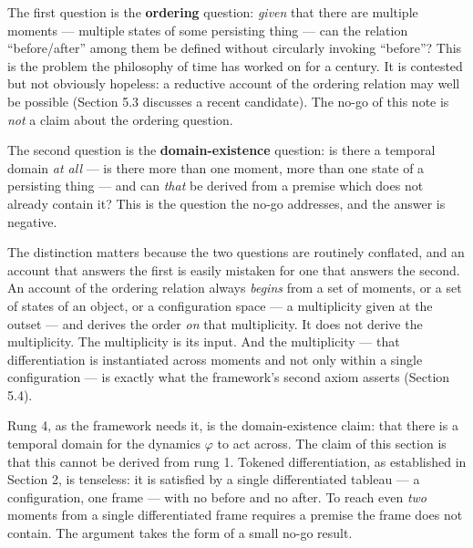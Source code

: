 \documentclass[
]{article}
\begin{document}
The first question is the \textbf{ordering} question: \emph{given} that
there are multiple moments --- multiple states of some persisting thing
--- can the relation ``before/after'' among them be defined without
circularly invoking ``before''? This is the problem the philosophy of
time has worked on for a century. It is contested but not obviously
hopeless: a reductive account of the ordering relation may well be
possible (Section 5.3 discusses a recent candidate). The no-go of this
note is \emph{not} a claim about the ordering question.

The second question is the \textbf{domain-existence} question: is there
a temporal domain \emph{at all} --- is there more than one moment, more
than one state of a persisting thing --- and can \emph{that} be derived
from a premise which does not already contain it? This is the question
the no-go addresses, and the answer is negative.

The distinction matters because the two questions are routinely
conflated, and an account that answers the first is easily mistaken for
one that answers the second. An account of the ordering relation always
\emph{begins} from a set of moments, or a set of states of an object, or
a configuration space --- a multiplicity given at the outset --- and
derives the order \emph{on} that multiplicity. It does not derive the
multiplicity. The multiplicity is its input. And the multiplicity ---
that differentiation is instantiated across moments and not only within
a single configuration --- is exactly what the framework's second axiom
asserts (Section 5.4).

Rung 4, as the framework needs it, is the domain-existence claim: that
there is a temporal domain for the dynamics \(\varphi\) to act across.
The claim of this section is that this cannot be derived from rung 1.
Tokened differentiation, as established in Section 2, is tenseless: it
is satisfied by a single differentiated tableau --- a configuration, one
frame --- with no before and no after. To reach even \emph{two} moments
from a single differentiated frame requires a premise the frame does not
contain. The argument takes the form of a small no-go result.
\end{document}
